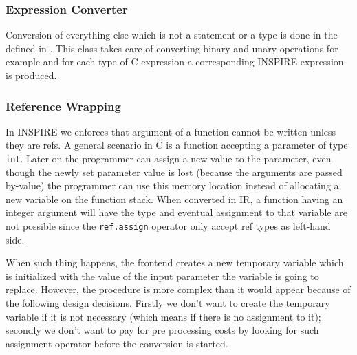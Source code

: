 \subsubsection{Expression Converter}
Conversion of everything else which is not a statement or a type is done in the
 defined in .
This class takes care of converting binary and unary operations for example and
for each type of C expression a corresponding INSPIRE expression is produced. 

\subsubsection{Reference Wrapping}
In INSPIRE we enforces that argument of a function cannot be written unless they
are refs. A general scenario in C is a function accepting a parameter of type
{\tt int}. Later on the programmer can assign a new value to the parameter, even
though the newly set parameter value is lost (because the arguments are passed
by-value) the programmer can use this memory location instead of allocating a
new variable on the function stack. When converted in IR, a function having an
integer argument will have the  type and
eventual assignment to that variable are not possible since the {\tt ref.assign}
operator only accept ref types as left-hand side. 

When such thing happens, the frontend creates a new temporary variable which is
initialized with the value of the input parameter the variable is going to
replace. However, the procedure is more complex than it would appear because of
the following design decisions. Firstly we don't want to create the temporary
variable if it  is not necessary (which means if there is no assignment to it);
secondly we don't want to pay for pre processing costs by looking for such
assignment operator before the conversion is started. 

